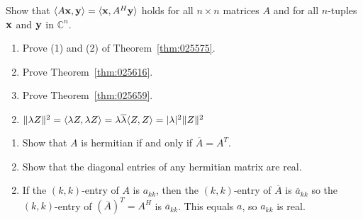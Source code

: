 \begin{multicols}{2}
\begin{ex}
Show that $\langle A \textbf{x}, \textbf{y} \rangle = \langle \textbf{x}, A^{H}\textbf{y}\rangle$ holds for all $n \times n$ matrices $A$ and for all $n$-tuples $\textbf{x}$ and $\textbf{y}$ in $\mathbb{C}^n$.
\end{ex}

\begin{ex}\label{ex:8_6_10}
\begin{enumerate}[label={\alph*.}]
\item Prove (1) and (2) of Theorem~\ref{thm:025575}.

\item Prove Theorem~\ref{thm:025616}.

\item Prove Theorem~\ref{thm:025659}.

\end{enumerate}
\begin{sol}
\begin{enumerate}[label={\alph*.}]
\setcounter{enumi}{1}
\item  $\| \lambda Z \|^2 = \langle \lambda Z, \lambda Z \rangle = \lambda\overline{\lambda} \langle Z, Z \rangle = |\lambda|^2 \| Z \|^2$


\end{enumerate}
\end{sol}
\end{ex}

\begin{ex}
\begin{enumerate}[label={\alph*.}]
\item Show that $A$ is hermitian if and only if $\overline{A} = A^T$.

\item Show that the diagonal entries of any hermitian matrix are real.

\end{enumerate}
\begin{sol}
\begin{enumerate}[label={\alph*.}]
\setcounter{enumi}{1}
\item  If the $(k, k)$-entry of $A$ is $a_{kk}$, then the $(k, k)$-entry of $\overline{A}$ is $\overline{a}_{kk}$ so the $(k, k)$-entry of $(\overline{A})^T = A^{H}$ is $\overline{a}_{kk}$. This equals $a$, so $a_{kk}$ is real.

\end{enumerate}
\end{sol}
\end{ex}


\end{multicols}
